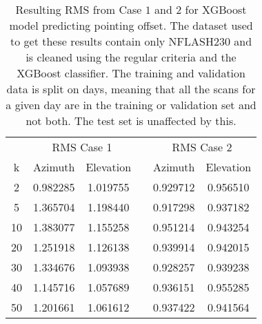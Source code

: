 \begin{table}[h]
    \centering %
    \caption{Resulting RMS from Case $1$ and $2$ for XGBoost model predicting pointing offset.
    The dataset used to get these results contain only NFLASH230 and is cleaned using the regular criteria and the XGBoost classifier.
    The training and validation data is split on days, meaning that all the scans for a given day
    are in the training or validation set and not both. The test set is unaffected by this.}
    \begin{tabular}{ccc c cc}
        \toprule
        \multicolumn{1}{c}{} & \multicolumn{2}{c}{RMS Case 1} & & \multicolumn{2}{c}{RMS Case 2} \\
        \cmidrule(lr){2-3} \cmidrule(lr){5-6}
         k & Azimuth & Elevation & & Azimuth & Elevation \\
        \midrule
        2 &  0.982285 &  1.019755 & &  0.929712 &  0.956510 \\
        5 &  1.365704 &  1.198440 & &  0.917298 &  0.937182 \\
       10 &  1.383077 &  1.155258 & &  0.951214 &  0.943254 \\
       20 &  1.251918 &  1.126138 & &  0.939914 &  0.942015 \\
       30 &  1.334676 &  1.093938 & &  0.928257 &  0.939238 \\
       40 &  1.145716 &  1.057689 & &  0.936151 &  0.955285 \\
       50 &  1.201661 &  1.061612 & &  0.937422 &  0.941564 \\
        \bottomrule
    \end{tabular}
\end{table}


